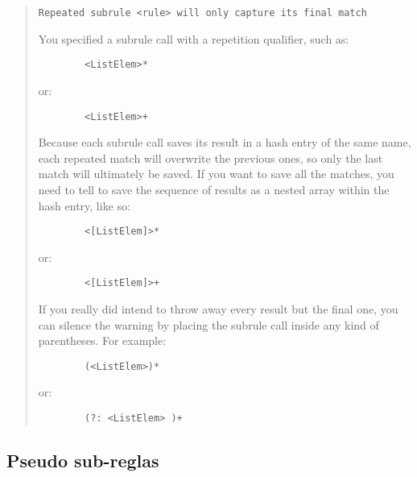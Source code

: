 \begin{it}\begin{quotation}
\verb|Repeated subrule <rule> will only capture its final match|

You specified a subrule call with a repetition qualifier, such as:

\begin{verbatim}
        <ListElem>*
\end{verbatim}

    or:

\begin{verbatim}
        <ListElem>+
\end{verbatim}

Because each subrule call saves its result in a hash entry of the
same name, each repeated match will overwrite the previous ones,
so only the last match will ultimately be saved. If you want to
save all the matches, you need to tell  to save the
sequence of results as a nested array within the hash entry, like so:

\begin{verbatim}
        <[ListElem]>*
\end{verbatim}

    or:

\begin{verbatim}
        <[ListElem]>+
\end{verbatim}

If you really did intend to throw away every result but the final
one, you can silence the warning by placing the subrule call inside
any kind of parentheses. For example:

\begin{verbatim}
        (<ListElem>)*
\end{verbatim}

    or:

\begin{verbatim}
        (?: <ListElem> )+
\end{verbatim}

\end{quotation}\end{it}


\subsection{Pseudo sub-reglas}


